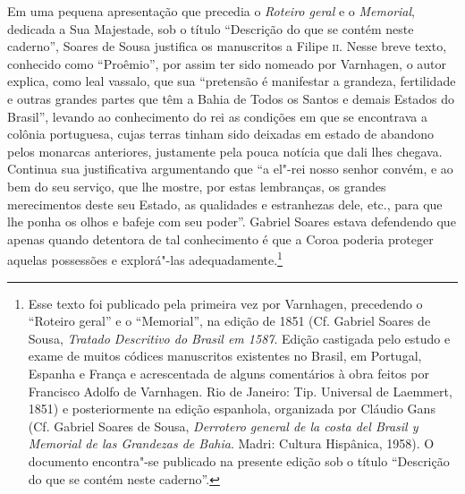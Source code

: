 Em uma pequena apresentação que precedia o \textit{Roteiro geral} e o
\textit{Memorial}, dedicada a Sua Majestade, sob o título “Descrição do
que se contém neste caderno”, Soares de Sousa justifica os manuscritos a
Filipe 	\textsc{ii}. Nesse breve texto, conhecido como “Proêmio”, por assim ter
sido nomeado por Varnhagen, o autor explica, como leal vassalo, que sua
“pretensão é manifestar a grandeza, fertilidade e outras grandes partes
que têm a Bahia de Todos os Santos e demais Estados do Brasil”, levando
ao conhecimento do rei as condições em que se encontrava a colônia
portuguesa, cujas terras tinham sido deixadas em estado de abandono
pelos monarcas anteriores, justamente pela pouca notícia que dali lhes
chegava. Continua sua justificativa argumentando que “a el"-rei nosso
senhor convém, e ao bem do seu serviço, que lhe mostre, por estas
lembranças, os grandes merecimentos deste seu Estado, as qualidades e
estranhezas dele, etc., para que lhe ponha os olhos e bafeje com seu
poder”. Gabriel Soares estava defendendo que apenas quando detentora de
tal conhecimento é que a Coroa poderia proteger aquelas possessões e
explorá"-las adequadamente.\footnote{ Esse texto foi publicado pela
primeira vez por Varnhagen, precedendo o “Roteiro geral” e o
“Memorial”, na edição de 1851 (Cf. Gabriel Soares de Sousa,
\textit{Tratado Descritivo do Brasil em 1587}. Edição castigada
pelo estudo e exame de muitos códices manuscritos existentes no Brasil,
em Portugal, Espanha e França e acrescentada de alguns comentários à
obra feitos por Francisco Adolfo de Varnhagen. Rio de Janeiro: Tip.
Universal de Laemmert, 1851) e posteriormente na edição espanhola,
organizada por Cláudio Gans (Cf. Gabriel Soares de Sousa, \textit{Derrotero general de la costa
del Brasil y Memorial de las Grandezas de Bahia}. Madri: Cultura
Hispânica, 1958). O documento encontra"-se publicado na presente edição
sob o título “Descrição do que se contém neste caderno”.}

